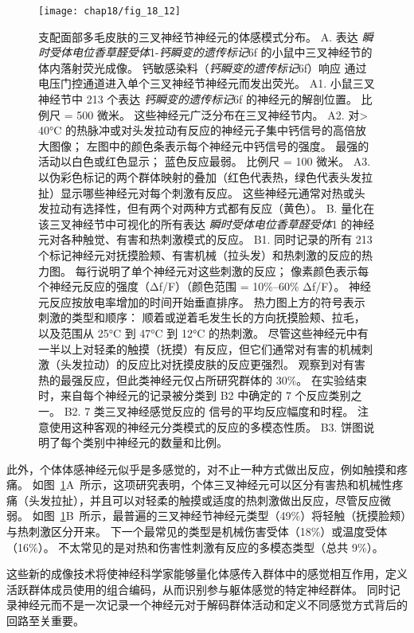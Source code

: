\begin{figure}[htbp]
	\centering
	\texttt{[image: chap18/fig\_18\_12]}
	\caption{支配面部多毛皮肤的三叉神经节神经元的体感模式分布\cite{ghitani2017specialized}。
		A. 表达 \textit{瞬时受体电位香草醛受体}1-\textit{钙瞬变的遗传标记}6f 的小鼠中三叉神经节的体内落射荧光成像。 
		钙敏感染料（\textit{钙瞬变的遗传标记}6f）响应  通过电压门控通道进入单个三叉神经节神经元而发出荧光。
		A1. 小鼠三叉神经节中 213 个表达 \textit{钙瞬变的遗传标记}6f 的神经元的解剖位置。
		比例尺 = 500 微米。
		这些神经元广泛分布在三叉神经节内。 
		A2. 对> 40°C 的热脉冲或对头发拉动有反应的神经元子集中钙信号的高倍放大图像；
		左图中的颜色条表示每个神经元中钙信号的强度。
		最强的活动以白色或红色显示；
		蓝色反应最弱。
		比例尺 = 100 微米。
		A3. 以伪彩色标记的两个群体映射的叠加（红色代表热，绿色代表头发拉扯）显示哪些神经元对每个刺激有反应。
		这些神经元通常对热或头发拉动有选择性，但有两个对两种方式都有反应（黄色）。
		B. 量化在该三叉神经节中可视化的所有表达 \textit{瞬时受体电位香草醛受体}1 的神经元对各种触觉、有害和热刺激模式的反应。
		B1. 同时记录的所有 213 个标记神经元对抚摸脸颊、有害机械（拉头发）和热刺激的反应的热力图。
		每行说明了单个神经元对这些刺激的反应；
		像素颜色表示每个神经元反应的强度（Δf/F）（颜色范围 = 10\%–60\% Δf/F）。
		神经元反应按放电率增加的时间开始垂直排序。
		热力图上方的符号表示刺激的类型和顺序：
		顺着或逆着毛发生长的方向抚摸脸颊、拉毛，以及范围从 25°C 到 47°C 到 12°C 的热刺激。
		尽管这些神经元中有一半以上对轻柔的触摸（抚摸）有反应，但它们通常对有害的机械刺激（头发拉动）的反应比对抚摸皮肤的反应更强烈。
		观察到对有害热的最强反应，但此类神经元仅占所研究群体的 30\%。
		在实验结束时，来自每个神经元的记录被分类到 B2 中确定的 7 个反应类别之一。
		B2. 7 类三叉神经感觉反应的  信号的平均反应幅度和时程。
		注意使用这种客观的神经元分类模式的反应的多模态性质。
		B3. 饼图说明了每个类别中神经元的数量和比例。}
	\label{fig:18_12}
\end{figure}


此外，个体体感神经元似乎是多感觉的，对不止一种方式做出反应，例如触摸和疼痛。
如图~\ref{fig:18_12}A~所示，这项研究表明，个体三叉神经元可以区分有害热和机械性疼痛（头发拉扯），并且可以对轻柔的触摸或适度的热刺激做出反应，尽管反应微弱。
如图~\ref{fig:18_12}B~所示，最普遍的三叉神经节神经元类型（49\%）将轻触（抚摸脸颊）与热刺激区分开来。 
下一个最常见的类型是机械伤害受体（18\%）或温度受体（16\%）。
不太常见的是对热和伤害性刺激有反应的多模态类型（总共 9\%）。


这些新的成像技术将使神经科学家能够量化体感传入群体中的感觉相互作用，定义活跃群体成员使用的组合编码，从而识别参与躯体感觉的特定神经群体。
同时记录神经元而不是一次记录一个神经元对于解码群体活动和定义不同感觉方式背后的回路至关重要。


